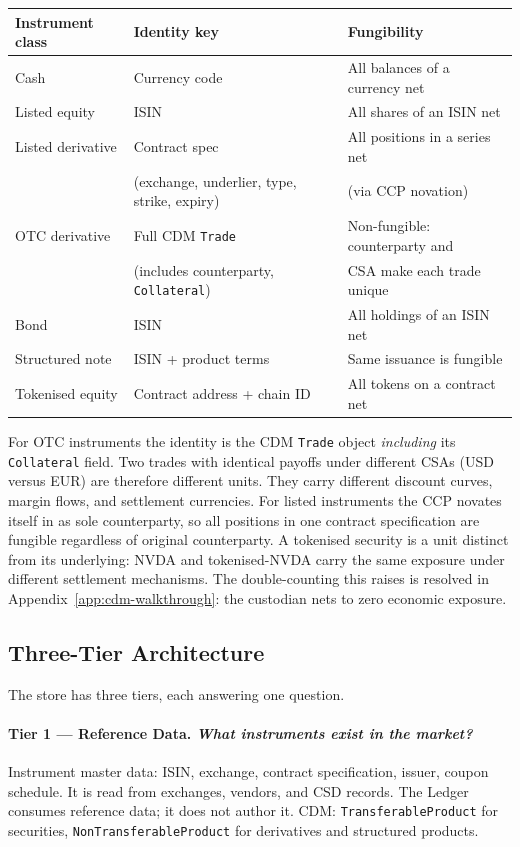\begin{center}
\small
\begin{tabular}{lll}
\toprule
\textbf{Instrument class} & \textbf{Identity key} & \textbf{Fungibility} \\
\midrule
Cash & Currency code & All balances of a currency net \\
Listed equity & ISIN & All shares of an ISIN net \\
Listed derivative & Contract spec & All positions in a series net \\
 & (exchange, underlier, type, strike, expiry) & (via CCP novation) \\
OTC derivative & Full CDM \texttt{Trade} & Non-fungible: counterparty and \\
 & (includes counterparty, \texttt{Collateral}) & CSA make each trade unique \\
Bond & ISIN & All holdings of an ISIN net \\
Structured note & ISIN + product terms & Same issuance is fungible \\
Tokenised equity & Contract address + chain ID & All tokens on a contract net \\
\bottomrule
\end{tabular}
\end{center}

For OTC instruments the identity is the CDM \texttt{Trade} object \emph{including} its \texttt{Collateral} field. Two trades with identical payoffs under different CSAs (USD versus EUR) are therefore different units. They carry different discount curves, margin flows, and settlement currencies. For listed instruments the CCP novates itself in as sole counterparty, so all positions in one contract specification are fungible regardless of original counterparty. A tokenised security is a unit distinct from its underlying: NVDA and tokenised-NVDA carry the same exposure under different settlement mechanisms. The double-counting this raises is resolved in Appendix~\ref{app:cdm-walkthrough}: the custodian nets to zero economic exposure.

\subsection{Three-Tier Architecture}

The store has three tiers, each answering one question.

\paragraph{Tier 1 --- Reference Data. \emph{What instruments exist in the market?}}
Instrument master data: ISIN, exchange, contract specification, issuer, coupon schedule. It is read from exchanges, vendors, and CSD records. The Ledger consumes reference data; it does not author it. CDM: \texttt{TransferableProduct} for securities, \texttt{NonTransferableProduct} for derivatives and structured products.

